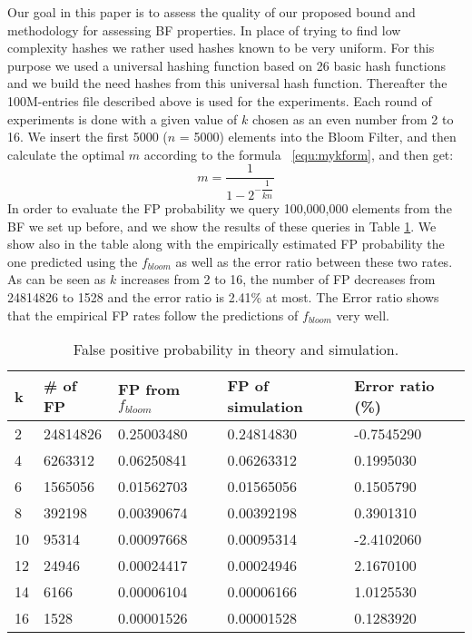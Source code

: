 Our goal in this paper is to assess the quality of our proposed bound and methodology for assessing BF properties. In place of trying to find low complexity hashes we rather used hashes known to be very uniform. For this purpose we used a universal hashing function based on 26 basic hash functions and we build the need hashes from this universal hash function. Thereafter the 100M-entries file described above is used for the experiments. Each round of experiments is done with a given value of $k$ chosen as an even number from 2 to 16. 
We insert the first 5000 ($n$ = 5000) elements into the Bloom Filter, and then calculate the optimal $m$ according to the formula ~\ref{equ:mykform}, and then get:
\begin{equation}
\label{formulaM}
m=\dfrac{1}{1-2^{-\dfrac{1}{kn}}}
\end{equation}
In order to evaluate the FP probability we query 100,000,000 elements from the BF we set up before, and we show the results of these queries in Table \ref{table:fp:theory:sim}. We show also in the table along with the empirically estimated FP probability the one predicted using the $f_{bloom}$ as well as the error ratio between these two rates. As can be seen as $k$ increases from 2 to 16, the number of FP decreases from 24814826 to 1528 and the error ratio is 2.41\% at most. 
The Error ratio shows that the empirical FP rates follow the predictions of $f_{bloom}$ very well. 
\begin{table}[htbp]
\vspace{-0.25in}
	\centering\caption{False positive probability in theory and simulation.}
\vspace{-0.1in}
	\begin{tabular}{l l l l l}
		\hline
		k   &	\# of FP	&	FP from $f_{bloom}$	&	FP of simulation	&	Error ratio	(\%)\\
		\hline
		2	&	24814826	&	0.25003480 	&	0.24814830 	&	-0.7545290 	\\
		4	&	6263312	&	0.06250841 	&	0.06263312 	&	0.1995030 	\\
		6	&	1565056	&	0.01562703 	&	0.01565056 	&	0.1505790 	\\
		8	&	392198	&	0.00390674 	&	0.00392198 	&	0.3901310 	\\
		10	&	95314	&	0.00097668 	&	0.00095314 	&	-2.4102060 	\\
		12	&	24946	&	0.00024417 	&	0.00024946 	&	2.1670100 	\\
		14	&	6166	&	0.00006104 	&	0.00006166 	&	1.0125530 	\\
		16	&	1528	&	0.00001526 	&	0.00001528 	&	0.1283920 	\\
		\hline
	\end{tabular}
	\label{table:fp:theory:sim}
\end{table}


